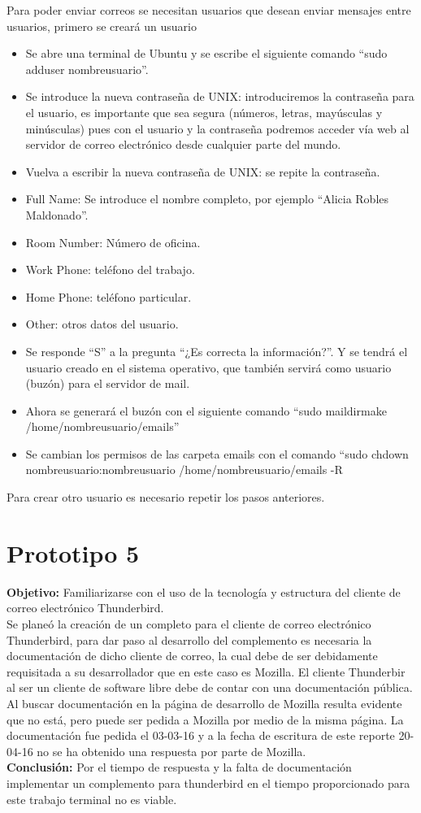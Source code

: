 \documentclass[12pt,oneside,onecolumn,openany]{report}
\begin{document}
Para poder enviar correos se necesitan usuarios que desean enviar mensajes entre usuarios, primero se creará un usuario
\begin{itemize}
 \item Se abre una terminal de Ubuntu y se escribe el siguiente comando “sudo adduser nombreusuario”.
 \item Se introduce la nueva contraseña de UNIX: introduciremos la contraseña para el usuario, es importante que sea segura (números, letras, mayúsculas y minúsculas) pues con el usuario y la contraseña podremos acceder vía web al servidor de correo electrónico desde cualquier parte del mundo.
 \item Vuelva a escribir la nueva contraseña de UNIX: se repite la contraseña.
 \item Full Name: Se introduce el nombre completo, por ejemplo ``Alicia Robles Maldonado''.
 \item Room Number: Número de oficina.
 \item Work Phone: teléfono del trabajo.
 \item Home Phone: teléfono particular.
 \item Other: otros datos del usuario.
 \item Se responde ``S'' a la pregunta ``¿Es correcta la información?''. Y se tendrá el usuario creado en el sistema operativo, que también servirá como usuario (buzón) para el servidor de mail.
 \item Ahora se generará el buzón con el siguiente comando “sudo maildirmake /home/nombreusuario/emails”
 \item Se cambian los permisos de las carpeta emails con el comando “sudo chdown nombreusuario:nombreusuario /home/nombreusuario/emails -R
\end{itemize}
Para crear otro usuario es necesario repetir los pasos anteriores.
\section{Prototipo 5}
\textbf{Objetivo:} Familiarizarse con el uso de la tecnología y estructura del cliente de correo electrónico Thunderbird.\\
Se planeó la creación de un completo para el cliente de correo electrónico Thunderbird, para dar paso al desarrollo del complemento es necesaria la documentación de dicho cliente de correo, la cual debe de ser debidamente requisitada a su desarrollador que en este caso es Mozilla. 
El cliente Thunderbir al ser un cliente de software libre debe de contar con una documentación pública. Al buscar documentación en la página de desarrollo de Mozilla resulta evidente que no está, pero puede ser pedida a Mozilla por medio de la misma página. La documentación fue pedida el 03-03-16 y a la fecha de escritura de este reporte 20-04-16 no se ha obtenido una respuesta por parte de Mozilla.\\
\textbf{Conclusión:} Por el tiempo de respuesta y la falta de documentación implementar un complemento para thunderbird en el tiempo proporcionado para este trabajo terminal no es viable.
\end{document}
